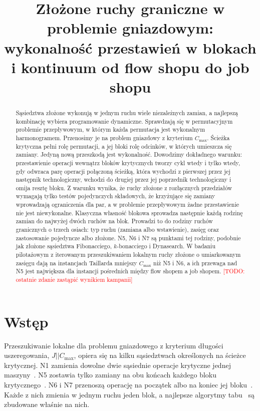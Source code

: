 \documentclass[10pt,twocolumn]{article}
\title{Złożone ruchy graniczne w problemie gniazdowym:\\
wykonalność przestawień w blokach\\
i kontinuum od flow shopu do job shopu}
\author{\todo{autorzy}}
\date{}
\newcommand{\todo}[1]{\textcolor{red}{[TODO: #1]}}
\newcommand{\Cmax}{C_{\max}}
\begin{document}
\maketitle

\begin{abstract}
Sąsiedztwa złożone wykonują w jednym ruchu wiele niezależnych zamian,
a najlepszą kombinację wybiera programowanie dynamiczne. Sprawdzają się
w permutacyjnym problemie przepływowym, w którym każda permutacja jest
wykonalnym harmonogramem. Przenosimy je na problem gniazdowy z kryterium
$\Cmax$. Ścieżka krytyczna pełni rolę permutacji, a jej bloki rolę
odcinków, w których umieszcza się zamiany. Jedyną nową przeszkodą jest
wykonalność. Dowodzimy dokładnego warunku: przestawienie operacji
wewnątrz bloków krytycznych tworzy cykl wtedy i tylko wtedy, gdy odwraca
parę operacji połączoną ścieżką, która wychodzi z pierwszej przez jej
następnik technologiczny, wchodzi do drugiej przez jej poprzednik
technologiczny i omija resztę bloku. Z warunku wynika, że ruchy złożone
z rozłącznych przedziałów wymagają tylko testów pojedynczych składowych,
że krzyżujące się zamiany wprowadzają ograniczenia dla par, a w problemie
przepływowym żadne przestawienie nie jest niewykonalne. Klasyczna
własność blokowa sprowadza następnie każdą rodzinę zamian do najwyżej
dwóch ruchów na blok. Prowadzi to do rodziny ruchów granicznych o trzech
osiach: typ ruchu (zamiana albo wstawienie), zasięg oraz zastosowanie
pojedyncze albo złożone. N5, N6 i N7 są punktami tej rodziny, podobnie
jak złożone sąsiedztwa Fibonacciego, $k$-bonacciego i Dynasearch.
W badaniu pilotażowym z iterowanym przeszukiwaniem lokalnym ruchy złożone
o umiarkowanym zasięgu dają na instancjach Taillarda mniejszy $\Cmax$ niż
N5 i N6, a ich przewaga nad N5 jest największa dla instancji pośrednich
między flow shopem a job shopem.
\todo{ostatnie zdanie zastąpić wynikiem kampanii}
\end{abstract}

\section{Wstęp}

Przeszukiwanie lokalne dla problemu gniazdowego z kryterium długości
uszeregowania, $J||\Cmax$, opiera się na kilku sąsiedztwach określonych na
ścieżce krytycznej. N1 zamienia dowolne dwie sąsiednie operacje krytyczne
jednej maszyny~\cite{laarhoven1992}. N5 zostawia tylko zamiany na obu
końcach każdego bloku krytycznego~\cite{nowicki1996}. N6 i N7 przenoszą
operację na początek albo na koniec jej
bloku~\cite{balas1998,zhang2007}. Każde z nich zmienia w jednym ruchu
jeden blok, a najlepsze algorytmy tabu~\cite{nowicki2005,peng2015} są
zbudowane właśnie na nich.
\end{document}
